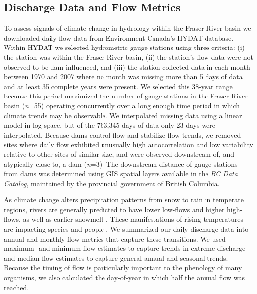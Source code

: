 \documentclass[linenumbers,draft]{AGUJournal}
\begin{document}
\subsection{Discharge Data and Flow Metrics}
To assess signals of climate change in hydrology within the Fraser River basin we downloaded daily flow data from Environment Canada's HYDAT database. Within HYDAT we selected hydrometric gauge stations using three criteria: (i) the station was within the Fraser River basin, (ii) the station's flow data were not observed to be dam influenced, and (iii) the station collected data in each month between 1970 and 2007 where no month was missing more than 5 days of data and at least 35 complete years were present. We selected this 38-year range because this period maximized the number of gauge stations in the Fraser River basin (\textit{n}=55) operating concurrently over a long enough time period in which climate trends may be observable. We interpolated missing data using a linear model in log-space, but of the 763,345 days of data only 23 days were interpolated. Because dams control flow and stabilize flow trends, we removed sites where daily flow exhibited unusually high autocorrelation and low variability relative to other sites of similar size, and were observed downstream of, and atypically close to, a dam (\textit{n}=3). The downstream distance of gauge stations from dams was determined using GIS spatial layers available in the \textit{BC Data Catalog}, maintained by the provincial government of British Columbia.

As climate change alters precipitation patterns from snow to rain in temperate regions, rivers are generally predicted to have lower low-flows and higher high-flows, as well as earlier snowmelt \citep{Nijssen:2001}. These manifestations of rising temperatures are impacting species \citep{Xenopoulos:2006} and people \citep{Hirabayashi:2013}. We summarized our daily discharge data into annual and monthly flow metrics that capture these transitions. We used maximum- and minimum-flow estimates to capture trends in extreme discharge and median-flow estimates to capture general annual and seasonal trends. Because the timing of flow is particularly important to the phenology of many organisms, we also calculated the day-of-year in which half the annual flow was reached. 
\end{document}

